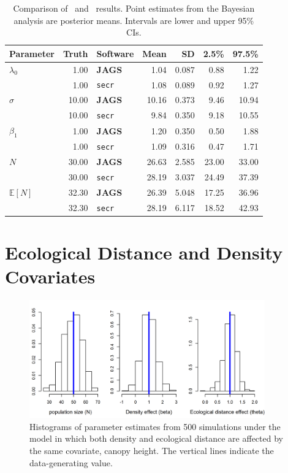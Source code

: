 \begin{table}%
\centering
\caption{Comparison of \secr~and \jags~results. Point estimates from
  the Bayesian analysis are posterior means. Intervals are lower and
  upper 95\% CIs.}
\begin{tabular}{lrlrrrr}
\hline
Parameter 	& Truth 	& Software 	& Mean 	& SD 	& 2.5\% & 97.5\% \\
\hline
 $\lambda_0$ 	&  1.00 	& \textbf{JAGS} 	&  1.04 	& 0.087 	&  0.88 	&  1.22 \\
  	&  1.00 	& \texttt{secr} 	&  1.08 	& 0.089 	&  0.92 	&  1.27 \\
 $\sigma$ 	& 10.00 	& \textbf{JAGS} 	& 10.16 	& 0.373 	&  9.46 	& 10.94 \\
  	& 10.00 	& \texttt{secr} 	&  9.84 	& 0.350 	&  9.18 	& 10.55 \\
 $\beta_1$ 	&  1.00 	& \textbf{JAGS} 	&  1.20 	& 0.350 	&  0.50 	&  1.88 \\
  	&  1.00 	& \texttt{secr} 	&  1.09 	& 0.316 	&  0.47 	&  1.71 \\
 $N$ 	& 30.00 	& \textbf{JAGS} 	& 26.63 	& 2.585 	& 23.00 	& 33.00 \\
  	& 30.00 	& \texttt{secr} 	& 28.19 	& 3.037 	& 24.49 	& 37.39 \\
 $\mathbb{E}[N]$ 	& 32.30 	& \textbf{JAGS} 	& 26.39 	& 5.048 	& 17.25 	& 36.96 \\
  	& 32.30 	& \texttt{secr} 	& 28.19 	& 6.117 	& 18.52 	& 42.93 \\
\hline
\end{tabular}
\label{state-space.tab.jagsVsecr}
\end{table}


\section{Ecological Distance and Density Covariates}

\begin{figure}[ht]
\centering
\includegraphics[width=4in,height=2in]{Ch11-Statespace/figs/scrDEDsim}
\caption{Histograms of parameter estimates from 500 simulations under
  the model in which both density and ecological distance are affected
by the same covariate, canopy height. The vertical lines indicate the
data-generating value.}
\label{ch9.fig.sim}
\end{figure}


